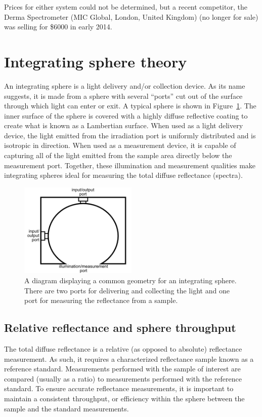 Prices for either system could not be determined, but a recent competitor, the Derma Spectrometer (MIC Global, London, United Kingdom) (no longer for sale) was selling for \$6000 in early 2014.

\section{Integrating sphere theory}
\label{sec:is_theory}
An integrating sphere is a light delivery and/or collection device. As its name suggests, it is made from a sphere with several ``ports'' cut out of the surface through which light can enter or exit. A typical sphere is shown in Figure~\ref{fig:intro-is_sample}. The inner surface of the sphere is covered with a highly diffuse reflective coating to create what is known as a Lambertian surface. When used as a light delivery device, the light emitted from the irradiation port is uniformly distributed and is isotropic in direction. When used as a measurement device, it is capable of capturing all of the light emitted from the sample area directly below the measurement port. Together, these illumination and measurement qualities make integrating spheres ideal for measuring the total diffuse reflectance (spectra).

\begin{figure}
	\centering \includegraphics[width=0.5\textwidth]{figures/intro-is_sample.png}
	\caption[Sample integrating sphere diagram]{\label{fig:intro-is_sample}A diagram displaying a common geometry for an integrating sphere. There are two ports for delivering and collecting the light and one port for measuring the reflectance from a sample.}
\end{figure}

\subsection{Relative reflectance and sphere throughput}
The total diffuse reflectance is a relative (as opposed to absolute) reflectance measurement. As such, it requires a characterized reflectance sample known as a reference standard. Measurements performed with the sample of interest are compared (usually as a ratio) to measurements performed with the reference standard. To ensure accurate reflectance measurements, it is important to maintain a consistent throughput, or efficiency within the sphere between the sample and the standard measurements.\cite{Hanssen2002}

